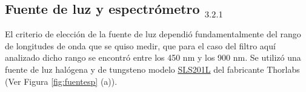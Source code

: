 
\singlespacing
\subsection{Fuente de luz y espectrómetro \href{https://github.com/jrr1984/defects_analysis/blob/master/light_sources_spectrum.py}{\faGithub$_{3.2.1}$}}
\label{sec:fteluzyesp}

\hspace{0.5cm}El criterio de elección de la fuente de luz dependió fundamentalmente del rango de longitudes de onda que se quiso medir, que para el caso del filtro aquí analizado dicho rango se encontró entre los 450 nm y los 900 nm.
Se utilizó una fuente de luz halógena y de tungsteno modelo \href{https://www.thorlabs.com/newgrouppage9.cfm?objectgroup_id=7269&pn=SLS201L/M}{SLS201L} del fabricante Thorlabs (Ver Figura \ref{fig:fuentesp} (a)). 

